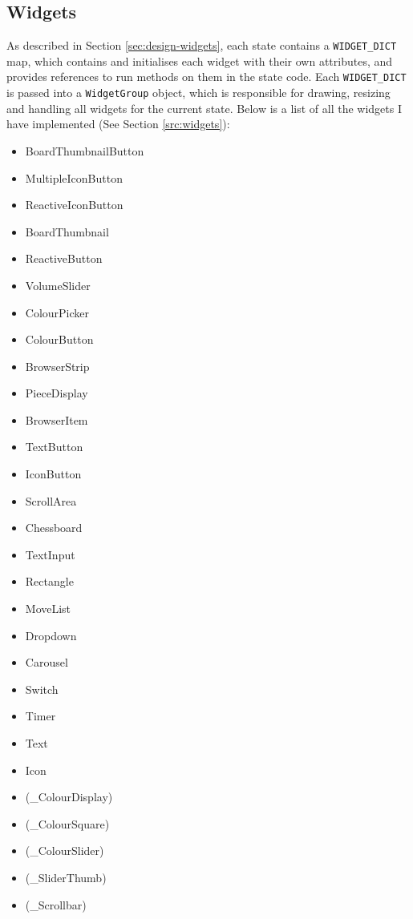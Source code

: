 \documentclass[../main/main.tex]{subfiles}
\begin{document}
\subsection{Widgets}
\label{sec:widgets}
As described in Section \ref{sec:design-widgets}, each state contains a \lstinline{WIDGET_DICT} map, which contains and initialises each widget with their own attributes, and provides references to run methods on them in the state code. Each \lstinline{WIDGET_DICT} is passed into a \lstinline{WidgetGroup} object, which is responsible for drawing, resizing and handling all widgets for the current state.
Below is a list of all the widgets I have implemented (See Section \ref{src:widgets}):

\begin{multicols}{3}
\begin{itemize}
\item BoardThumbnailButton
\item MultipleIconButton
\item ReactiveIconButton
\item BoardThumbnail
\item ReactiveButton
\item VolumeSlider
\item ColourPicker
\item ColourButton
\item BrowserStrip
\item PieceDisplay
\item BrowserItem
\item TextButton
\item IconButton
\item ScrollArea
\item Chessboard
\item TextInput
\item Rectangle
\item MoveList
\item Dropdown
\item Carousel
\item Switch
\item Timer
\item Text
\item Icon
\item (\_ColourDisplay)
\item (\_ColourSquare)
\item (\_ColourSlider)
\item (\_SliderThumb)
\item (\_Scrollbar)
\end{itemize}
\end{multicols}
\end{document}
